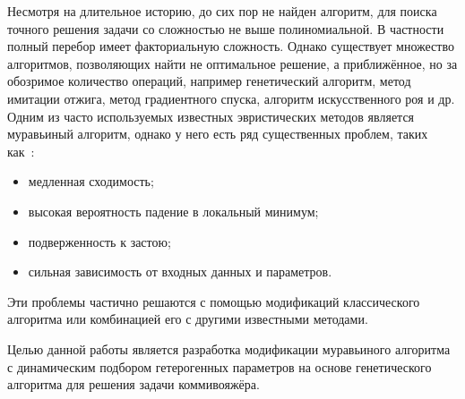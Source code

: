 Несмотря на длительное историю, до сих пор не найден алгоритм, для поиска точного решения задачи со сложностью не выше полиномиальной. В частности полный перебор имеет факториальную сложность. Однако существует множество алгоритмов, позволяющих найти не оптимальное решение, а приближённое, но за обозримое количество операций, например генетический алгоритм, метод имитации отжига, метод градиентного спуска, алгоритм искусственного роя и др. Одним из часто используемых известных эвристических методов является муравьиный алгоритм, однако у него есть ряд существенных проблем, таких как~\cite{impaco}:
\begin{itemize}
	\item медленная сходимость;
	\item высокая вероятность падение в локальный минимум;
	\item подверженность к застою;
	\item сильная зависимость от входных данных и параметров.
\end{itemize}

Эти проблемы частично решаются с помощью модификаций классического алгоритма или комбинацией его с другими известными методами.

Целью данной работы является разработка модификации муравьиного алгоритма с динамическим подбором гетерогенных параметров на основе генетического алгоритма для решения задачи коммивояжёра.
\clearpage
